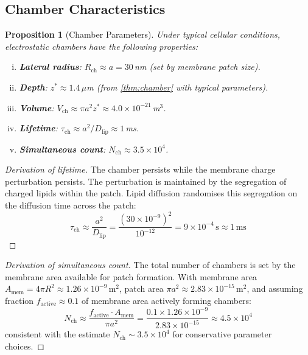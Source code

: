 \documentclass[11pt,twocolumn,a4paper]{article}
\newtheorem{proposition}[theorem]{Proposition}
\theoremstyle{definition}
\theoremstyle{remark}
\newcommand{\Rcham}{R_{\mathrm{ch}}}
\newcommand{\Ncham}{N_{\mathrm{ch}}}
\newcommand{\taucham}{\tau_{\mathrm{ch}}}
\newcommand{\zstar}{z^{*}}
\begin{document}
\subsection{Chamber Characteristics}

\begin{proposition}[Chamber Parameters]
\label{prop:chamber_params}
Under typical cellular conditions, electrostatic chambers have the following properties:
\begin{enumerate}[(i)]
  \item \textbf{Lateral radius}: $\Rcham \approx a = 30$\,nm (set by membrane patch size).
  \item \textbf{Depth}: $\zstar \approx 1.4\,\mu$m (from \cref{thm:chamber} with typical parameters).
  \item \textbf{Volume}: $V_{\mathrm{ch}} \approx \pi a^2 \zstar \approx 4.0 \times 10^{-21}$\,m$^3$.
  \item \textbf{Lifetime}: $\taucham \approx a^2 / D_{\mathrm{lip}} \approx 1$\,ms.
  \item \textbf{Simultaneous count}: $\Ncham \approx 3.5 \times 10^4$.
\end{enumerate}
\end{proposition}

\begin{proof}[Derivation of lifetime]
The chamber persists while the membrane charge perturbation persists. The perturbation is maintained by the segregation of charged lipids within the patch. Lipid diffusion randomises this segregation on the diffusion time across the patch:
\begin{equation}
  \taucham \approx \frac{a^2}{D_{\mathrm{lip}}} = \frac{(30 \times 10^{-9})^2}{10^{-12}} = 9 \times 10^{-4}\,\mathrm{s} \approx 1\,\mathrm{ms}
\end{equation}
\end{proof}

\begin{proof}[Derivation of simultaneous count]
The total number of chambers is set by the membrane area available for patch formation. With membrane area $A_{\mathrm{mem}} = 4\pi R^2 \approx 1.26 \times 10^{-9}$\,m$^2$, patch area $\pi a^2 \approx 2.83 \times 10^{-15}$\,m$^2$, and assuming fraction $f_{\mathrm{active}} \approx 0.1$ of membrane area actively forming chambers:
\begin{equation}
  \Ncham \approx \frac{f_{\mathrm{active}} \cdot A_{\mathrm{mem}}}{\pi a^2} = \frac{0.1 \times 1.26 \times 10^{-9}}{2.83 \times 10^{-15}} \approx 4.5 \times 10^4
\end{equation}
consistent with the estimate $\Ncham \sim 3.5 \times 10^4$ for conservative parameter choices.
\end{proof}
\end{document}
